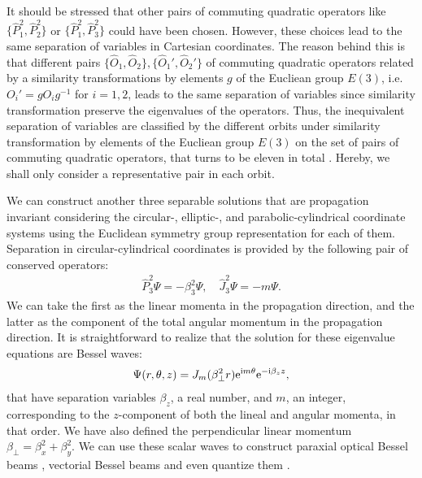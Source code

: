 \documentclass[12pt]{iopart}
\begin{document}
It should be stressed that other pairs of commuting quadratic operators like $\{\hat{P}_{1}^2,\hat{P}_{2}^2\}$ or $\{\hat{P}_{1}^2,\hat{P}_{3}^2\}$ could have been chosen. However, these choices lead to the same separation of variables in Cartesian coordinates.
The reason behind this is that different pairs $\{\hat{O}_1,\hat{O}_2\},\{\hat{O}_1',\hat{O}_2'\}$ of commuting quadratic operators related by a similarity transformations by elements $g$ of the Eucliean group $E(3)$, i.e.  $O_i'=gO_i g^{-1}$ for $i=1,2$, leads to the same separation of variables since
similarity transformation preserve the eigenvalues of the operators. Thus, the inequivalent separation of variables are classified by the different orbits under similarity transformation by elements of the Eucliean group $E(3)$ on the set of pairs of commuting  quadratic operators, that turns to be eleven in total \cite{Boyer1976p35,Miller1984}. Hereby, we shall only consider a representative pair in each orbit.

We can construct another three separable solutions that are propagation invariant considering the circular-, elliptic-, and parabolic-cylindrical coordinate systems using the Euclidean symmetry group representation for each of them.
Separation in circular-cylindrical coordinates is provided by the following pair of conserved operators:
\begin{eqnarray}
\hat{P}_{3}^2 \Psi = - \beta_{3}^2  \Psi, \quad \hat{J}_{3}^2 \Psi = - m  \Psi.
\end{eqnarray}
We can take the first as the linear momenta in the propagation direction, and the latter as the component of the total angular momentum in the propagation direction.
It is straightforward to realize that the solution for these eigenvalue equations are Bessel waves:
\begin{eqnarray}
\Psi(r, \theta, z) = J_{m}(\beta_{\perp}^2 r) {\rm e}^{{\rm i} m \theta} {\rm e}^{-{\rm i} \beta_{z} z}  ,
\end{eqnarray}
that have separation variables $\beta_{z}$, a real number, and $m$, an integer, corresponding to the $z$-component of both the lineal and angular momenta, in that order. We have also defined the perpendicular linear momentum $\beta_{\perp} = \beta_{x}^{2} + \beta_{y}^{2}$.
We can use these scalar waves to construct paraxial optical Bessel beams \cite{Durnin1987p1499}, vectorial Bessel beams and even quantize them \cite{Jauregui2005p033411}.
\end{document}
